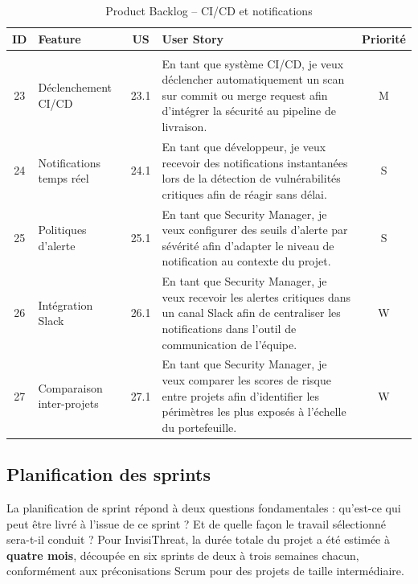 \begin{table}[H]
\centering
\caption{Product Backlog -- CI/CD et notifications}
\label{tab:backlog-cicd-notif}
\small
\renewcommand{\arraystretch}{1.2}
\begin{tabularx}{\textwidth}{c X c X c}
\hline
\rowcolor{gray!15}
\textbf{ID} & \textbf{Feature} & \textbf{US} & \textbf{User Story} & \textbf{Priorité} \\
\hline
\rowcolor{gray!10}
\multicolumn{5}{c}{\textbf{Module CI/CD et Notifications}} \\
\hline
23 & Déclenchement CI/CD & 23.1
  & En tant que système CI/CD, je veux déclencher automatiquement un scan sur
    commit ou merge request afin d'intégrer la sécurité au pipeline de livraison. & M \\
24 & Notifications temps réel & 24.1
  & En tant que développeur, je veux recevoir des notifications instantanées lors
    de la détection de vulnérabilités critiques afin de réagir sans délai. & S \\
25 & Politiques d'alerte & 25.1
  & En tant que Security Manager, je veux configurer des seuils d'alerte par sévérité
    afin d'adapter le niveau de notification au contexte du projet. & S \\
26 & Intégration Slack & 26.1
  & En tant que Security Manager, je veux recevoir les alertes critiques dans un canal
    Slack afin de centraliser les notifications dans l'outil de communication de
    l'équipe. & W \\
27 & Comparaison inter-projets & 27.1
  & En tant que Security Manager, je veux comparer les scores de risque entre projets
    afin d'identifier les périmètres les plus exposés à l'échelle du portefeuille. & W \\
\hline
\end{tabularx}
\end{table}

\subsection{Planification des sprints}

La planification de sprint répond à deux questions fondamentales : qu'est-ce qui peut
être livré à l'issue de ce sprint ? Et de quelle façon le travail sélectionné
sera-t-il conduit ? Pour InvisiThreat, la durée totale du projet a été estimée à
\textbf{quatre mois}, découpée en six sprints de deux à trois semaines chacun,
conformément aux préconisations Scrum pour des projets de taille intermédiaire.

